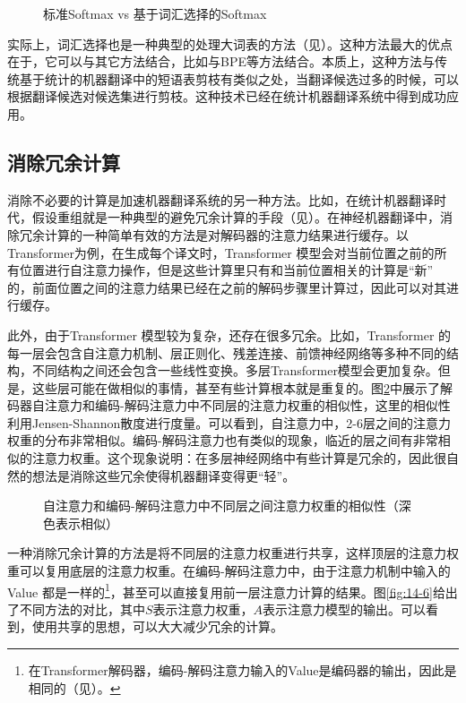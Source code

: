 \begin{figure}[htp]
\centering

\caption{标准Softmax vs 基于词汇选择的Softmax}
\label{fig:14-4}
\end{figure}
\parinterval 实际上，词汇选择也是一种典型的处理大词表的方法（见\chapterthirteen）。这种方法最大的优点在于，它可以与其它方法结合，比如与BPE等方法结合。本质上，这种方法与传统基于统计的机器翻译中的短语表剪枝有类似之处，当翻译候选过多的时候，可以根据翻译候选对候选集进行剪枝。这种技术已经在统计机器翻译系统中得到成功应用。



\subsection{消除冗余计算}

\parinterval 消除不必要的计算是加速机器翻译系统的另一种方法。比如，在统计机器翻译时代，假设重组就是一种典型的避免冗余计算的手段（见{\chapterseven}）。在神经机器翻译中，消除冗余计算的一种简单有效的方法是对解码器的注意力结果进行缓存。以Transformer为例，在生成每个译文时，Transformer 模型会对当前位置之前的所有位置进行自注意力操作，但是这些计算里只有和当前位置相关的计算是“新” 的，前面位置之间的注意力结果已经在之前的解码步骤里计算过，因此可以对其进行缓存。

\parinterval 此外，由于Transformer 模型较为复杂，还存在很多冗余。比如，Transformer 的每一层会包含自注意力机制、层正则化、残差连接、前馈神经网络等多种不同的结构，不同结构之间还会包含一些线性变换。多层Transformer模型会更加复杂。但是，这些层可能在做相似的事情，甚至有些计算根本就是重复的。图\ref{fig:14-5}中展示了解码器自注意力和编码-解码注意力中不同层的注意力权重的相似性，这里的相似性利用Jensen-Shannon散度进行度量。可以看到，自注意力中，2-6层之间的注意力权重的分布非常相似。编码-解码注意力也有类似的现象，临近的层之间有非常相似的注意力权重。这个现象说明：在多层神经网络中有些计算是冗余的，因此很自然的想法是消除这些冗余使得机器翻译变得更“轻”。

\begin{figure}[htp]
\centering

\caption{自注意力和编码-解码注意力中不同层之间注意力权重的相似性（深色表示相似）}
\label{fig:14-5}
\end{figure}
\parinterval 一种消除冗余计算的方法是将不同层的注意力权重进行共享，这样顶层的注意力权重可以复用底层的注意力权重。在编码-解码注意力中，由于注意力机制中输入的Value 都是一样的\footnote{在Transformer解码器，编码-解码注意力输入的Value是编码器的输出，因此是相同的（见\chaptertwelve）。}，甚至可以直接复用前一层注意力计算的结果。图\ref{fig:14-6}给出了不同方法的对比，其中$S$表示注意力权重，$A$表示注意力模型的输出。可以看到，使用共享的思想，可以大大减少冗余的计算。

